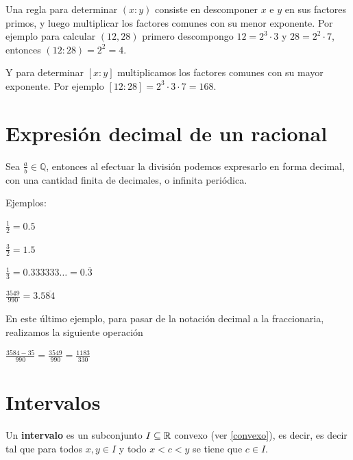 \begin{observation}
Una regla para determinar $(x:y)$ consiste en descomponer $x$ e $y$ en sus factores primos, y luego multiplicar los factores comunes con su menor exponente.  Por ejemplo para calcular $(12,28)$ primero descompongo $12 = 2^3 \cdot 3$ y $28 = 2^2 \cdot 7$, entonces $(12:28) = 2^2 = 4$.
	
Y para determinar $[x:y]$ multiplicamos los factores comunes con su mayor exponente.  Por ejemplo $[12:28] = 2^3 \cdot 3 \cdot 7 = 168$.	
\end{observation}

\section{Expresión decimal de un racional} 

Sea $\frac{a}{b} \in \mathbb{Q}$, entonces al efectuar la división podemos expresarlo en forma decimal, con una cantidad finita de decimales, o infinita periódica.

Ejemplos:

$\frac{1}{2} = 0.5$

$\frac{3}{2} = 1.5$

$\frac{1}{3} = 0.333333\ldots = 0.\overline{3}$

$\frac{3549}{990} = 3.5\overline{84}$

En este último ejemplo, para pasar de la notación decimal a la fraccionaria, realizamos la siguiente operación

$ \frac{3584 - 35}{990} = \frac{3549}{990} = \frac{1183}{330}$

\section{Intervalos}

\begin{definition}[Intervalo]  \label{intervalo}
Un \textbf{intervalo} es un subconjunto $I \subseteq \mathbb{R}$ convexo (ver \ref{convexo}), es decir, es decir tal que para todos $x,y \in I$ y todo $x < c < y$ se tiene que $c \in I$.
\end{definition}


